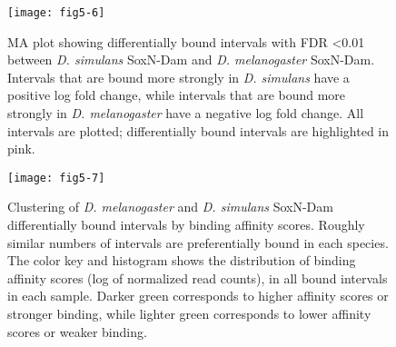 \begin{figure}
\centering
\texttt{[image: fig5-6]}
\caption{MA plot showing differentially bound intervals with FDR \textless 0.01 between \emph{D. simulans} SoxN-Dam and \emph{D. melanogaster} SoxN-Dam. Intervals that are bound more strongly in \emph{D. simulans} have a positive log fold change, while intervals that are bound more strongly in \emph{D. melanogaster} have a negative log fold change. All intervals are plotted; differentially bound intervals are highlighted in pink.}
\label{Figure 5.6}
\end{figure}

\begin{figure}
\centering
\texttt{[image: fig5-7]}
\caption{Clustering of \emph{D. melanogaster} and \emph{D. simulans} SoxN-Dam differentially bound intervals by binding affinity scores. Roughly similar numbers of intervals are preferentially bound in each species. The color key and histogram shows the distribution of binding affinity scores (log of normalized read counts), in all bound intervals in each sample. Darker green corresponds to higher affinity scores or stronger binding, while lighter green corresponds to lower affinity scores or weaker binding.}
\label{Figure 5.7}
\end{figure}

